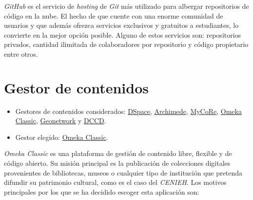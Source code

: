 \emph{GitHub} es el servicio de \emph{hosting} de \emph{Git} más utilizado para albergar
repositorios de código en la nube. El hecho de que cuente con una enorme
comunidad de usuarios y que además ofrezca servicios exclusivos y
gratuitos a estudiantes, lo convierte en la mejor opción posible. Alguno
de estos servicios son: repositorios privados, cantidad ilimitada de
colaboradores por repositorio y código propietario entre otros.

\section{Gestor de contenidos}

\begin{itemize}
\tightlist
\item
  Gestores de contenidos considerados:
  \href{https://duraspace.org/dspace/}{DSpace},
  \href{https://www.bibl.ulaval.ca/archimede/index.en.html}{Archimede},
  \href{https://www.mycore.de/}{MyCoRe},
  \href{https://omeka.org/classic/}{Omeka Classic},
  \href{https://github.com/geonetwork/core-geonetwork/}{Geonetwork} y
  \href{https://github.com/DANS-KNAW/dccd-webui}{DCCD}.
\item
  Gestor elegido: \href{https://omeka.org/classic/}{Omeka Classic}.
\end{itemize}

\emph{Omeka Classic} es una plataforma de gestión de contenido libre,
flexible y de código abierto. Su misión principal es la publicación de
colecciones digitales provenientes de bibliotecas, museos o cualquier
tipo de institución que pretenda difundir su patrimonio cultural, como
es el caso del \emph{CENIEH}. Los motivos principales por los que se ha
decidido escoger esta aplicación son:


